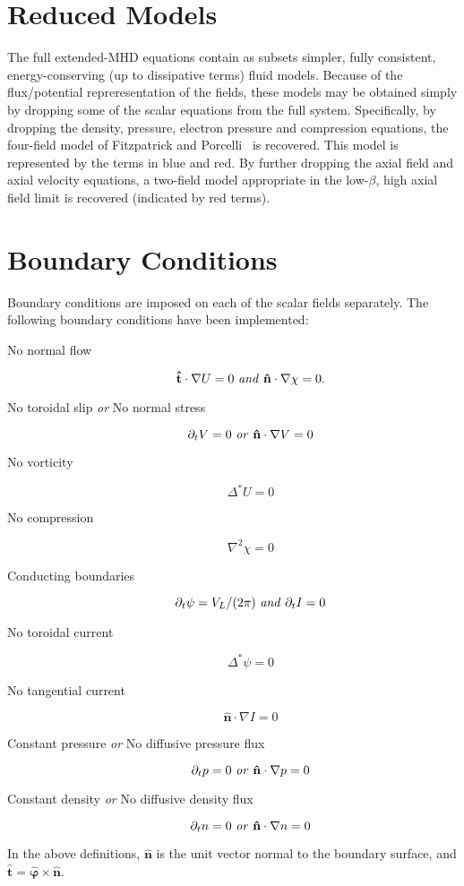\documentclass[letterpaper]{book}
\renewcommand{\vec}[1]{\ensuremath{\mathbf{#1}}}
\newcommand{\tor}{\varphi}              %
\newcommand{\grad}[1]{\nabla #1}
\newcommand{\gs}[1]{\Delta^* #1}
\newcommand{\lp}[1]{\nabla^2 #1}
\newcommand{\uvec}[1]{\ensuremath{\vec{\hat{#1}}}}
\begin{document}
\section{Reduced Models}

The full extended-MHD equations contain as subsets simpler, fully
consistent, energy-conserving (up to dissipative terms) fluid models.
Because of the flux/po\-ten\-tial repreresentation of the fields, these
models may be obtained simply by dropping some of the scalar equations
from the full system.  Specifically, by dropping the density,
pressure, electron pressure and compression equations, the four-field
model of Fitzpatrick and Porcelli~\cite{Fitzpatrick04} is recovered.
This model is represented by the terms in blue and red.  By further
dropping the axial field and axial velocity equations, a two-field
model appropriate in the low-$\beta$, high axial field limit is
recovered (indicated by red terms).


\section{Boundary Conditions}

Boundary conditions are imposed on each of the scalar fields
separately.  The following boundary conditions have been implemented:

\begin{description}
\item[No normal flow]
  \[ \uvec{t} \cdot \grad U = 0  \mbox{ \emph{and} }
     \uvec{n} \cdot \grad\chi = 0. \]
\item[No toroidal slip \emph{or} No normal stress]
  \[ \partial_t V = 0 \mbox{ \emph{or} } \uvec{n} \cdot \grad V = 0 \]
\item[No vorticity]
  \[ \gs{U} = 0 \]
\item[No compression]
  \[ \lp{\chi} = 0 \]
\item[Conducting boundaries]
  \[ \partial_t \psi = V_L / (2 \pi) \mbox{ \emph{and} } \partial_t I = 0 \]
\item[No toroidal current]
  \[ \gs{\psi} = 0 \]
\item[No tangential current]
  \[ \uvec{n} \cdot \grad I = 0 \]
\item[Constant pressure \emph{or} No diffusive pressure flux]
  \[ \partial_t p = 0 \mbox{ \emph{or} } \uvec{n} \cdot \grad p = 0 \]
\item[Constant density \emph{or} No diffusive density flux]
  \[ \partial_t n = 0 \mbox{ \emph{or} } \uvec{n} \cdot \grad n = 0 \]
\end{description}
In the above definitions, $\uvec{n}$ is the unit vector normal to the
boundary surface, and $\uvec{t} = \uvec{\tor} \times \uvec{n}$.
\end{document}
